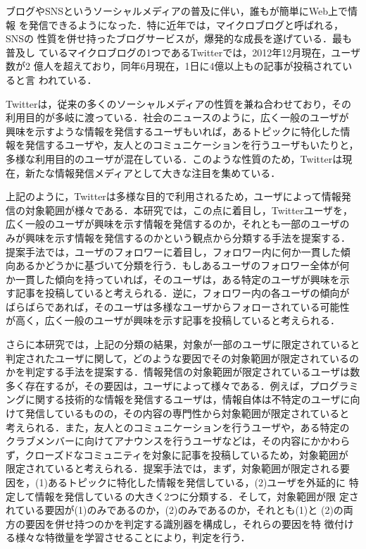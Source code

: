 \begin{jabstract}
ブログやSNSというソーシャルメディアの普及に伴い，誰もが簡単にWeb上で情報
 を発信できるようになった．特に近年では，マイクロブログと呼ばれる，SNSの
 性質を併せ持ったブログサービスが，爆発的な成長を遂げている．最も普及し
 ているマイクロブログの1つであるTwitterでは，2012年12月現在，ユーザ数が2
 億人を超えており，同年6月現在，1日に4億以上もの記事が投稿されていると言
 われている．

Twitterは，従来の多くのソーシャルメディアの性質を兼ね合わせており，その
 利用目的が多岐に渡っている．社会のニュースのように，広く一般のユーザが
 興味を示すような情報を発信するユーザもいれば，あるトピックに特化した情
 報を発信するユーザや，友人とのコミュニケーションを行うユーザもいたりと，
 多様な利用目的のユーザが混在している．このような性質のため，Twitterは現
 在，新たな情報発信メディアとして大きな注目を集めている．

上記のように，Twitterは多様な目的で利用されるため，ユーザによって情報発
 信の対象範囲が様々である．本研究では，この点に着目し，Twitterユーザを，
 広く一般のユーザが興味を示す情報を発信するのか，それとも一部のユーザの
 みが興味を示す情報を発信するのかという観点から分類する手法を提案する．
 提案手法では，ユーザのフォロワーに着目し，フォロワー内に何か一貫した傾
 向あるかどうかに基づいて分類を行う．もしあるユーザのフォロワー全体が何
 か一貫した傾向を持っていれば，そのユーザは，ある特定のユーザが興味を示
 す記事を投稿していると考えられる．逆に，フォロワー内の各ユーザの傾向が
 ばらばらであれば，そのユーザは多様なユーザからフォローされている可能性
 が高く，広く一般のユーザが興味を示す記事を投稿していると考えられる．

さらに本研究では，上記の分類の結果，対象が一部のユーザに限定されていると
 判定されたユーザに関して，どのような要因でその対象範囲が限定されているの
 かを判定する手法を提案する．情報発信の対象範囲が限定されているユーザは数
 多く存在するが，その要因は，ユーザによって様々である．例えば，プログラミ
 ングに関する技術的な情報を発信するユーザは，情報自体は不特定のユーザに向
 けて発信しているものの，その内容の専門性から対象範囲が限定されていると
 考えられる．また，友人とのコミュニケーションを行うユーザや，ある特定の
 クラブメンバーに向けてアナウンスを行うユーザなどは，その内容にかかわら
 ず，クローズドなコミュニティを対象に記事を投稿しているため，対象範囲が
 限定されていると考えられる．提案手法では，まず，対象範囲が限定される要
 因を，(1)あるトピックに特化した情報を発信している，(2)ユーザを外延的に
 特定して情報を発信している\,の大きく2つに分類する．そして，対象範囲が限
 定されている要因が(1)のみであるのか，(2)のみであるのか，それとも(1)と
 (2)の両方の要因を併せ持つのかを判定する識別器を構成し，それらの要因を特
 徴付ける様々な特徴量を学習させることにより，判定を行う．


\end{jabstract}

